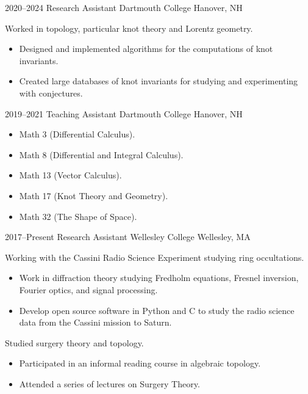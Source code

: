 \documentclass[a4paper,sans]{moderncv}
\begin{document}
        \cventry%
            {2020--2024}
            {Research Assistant}
            {Dartmouth College}
            {Hanover, NH}
            {}
            {%
                Worked in topology,
                particular knot theory and Lorentz geometry.
                \begin{itemize}
                    \item
                        Designed and implemented algorithms for the
                        computations of knot invariants.
                    \item
                        Created large databases of knot invariants for studying
                        and experimenting with conjectures.
                \end{itemize}%
             }
        \cventry%
            {2019--2021}
            {Teaching Assistant}
            {Dartmouth College}
            {Hanover, NH}
            {}
            {%
                \begin{itemize}
                    \item
                        Math 3 (Differential Calculus).
                    \item
                        Math 8 (Differential and Integral Calculus).
                    \item
                        Math 13 (Vector Calculus).
                    \item
                        Math 17 (Knot Theory and Geometry).
                    \item
                        Math 32 (The Shape of Space).
                \end{itemize}
            }
        \cventry%
            {2017--Present}
            {Research Assistant}
            {Wellesley College}
            {Wellesley, MA}
            {}
            {%
                Working with the Cassini Radio Science
                Experiment studying ring occultations.
                \begin{itemize}
                    \item
                        Work in diffraction theory studying Fredholm
                        equations, Fresnel inversion, Fourier optics,
                        and signal processing.
                     \item
                        Develop open source software in Python and C to
                        study the radio science data from the
                        Cassini mission to Saturn.
                 \end{itemize}
                 Studied surgery theory and topology.
                 \begin{itemize}
                     \item
                        Participated in an informal reading
                        course in algebraic topology.
                     \item
                        Attended a series of lectures on Surgery Theory.
                 \end{itemize}%
             }
\end{document}
